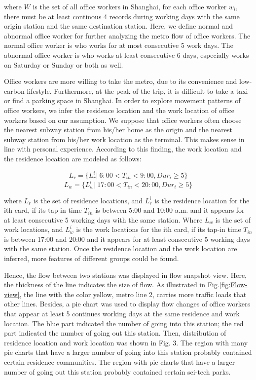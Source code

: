 \documentclass[journal,transmag]{IEEEtran}
\begin{document}
where $W$ is the set of all office workers in Shanghai, for each office worker $w_{i}$, there must be at least continous 4 records during working days with the same origin station and the same destination station.
Here, we define normal and abnormal office worker for further analyzing the metro flow of office workers. The normal office worker is who works for at most consecutive 5 work days. The abnormal office worker is who works at least consecutive 6 days, especially works on Saturday or Sunday or both as well. 

Office workers are more willing to take the metro, due to its convenience and low-carbon lifestyle. Furthermore, at the peak of the trip, it is difficult to take a taxi or find a parking space in Shanghai. In order to explore movement patterns of office workers, we infer the residence location and the work location of office workers based on our assumption. We suppose that office workers often choose the nearest subway station from his/her home as the origin and the nearest subway station from his/her work location as the terminal. This makes sense in line with personal experience. According to this finding, the work location and the residence location are modeled as follows:

\begin{equation}
L_{r}=\{L_{r}^i|\ 6:00< T_{in} < 9:00, Dur_{i}\ge5\}
\end{equation}
\begin{equation}
L_{w}=\{L_{w}^i|\ 17:00< T_{in} < 20:00, Dur_{i}\ge5\}
\end{equation}

where $L_{r}$ is the set of residence locations, and $L_{r}^i$ is the residence location for the ith card, if its tap-in time $T_{in}$ is between 5:00 and 10:00 a.m. and it appears for at least consecutive 5 working days with the same station. Where $L_{w}$ is the set of work locations, and $L_{w}^i$ is the work locations for the ith card, if its tap-in time $T_{in}$ is between 17:00 and 20:00 and it appears for at least consecutive 5 working days with the same station. Once the residence location and the work location are inferred, more features of different groups could be found.

Hence, the flow between two stations was displayed in flow snapshot view.  Here, the thickness of the line indicates the size of flow. As illustrated in Fig.\ref{fig:Flow-view}, the line with the color yellow, metro line 2, carries more traffic loads that other lines. Besides, a pie chart was used to display flow changes of office workers that appear at least 5 continues working days at the same residence and work location. The blue part indicated the number of going into this station; the red part indicated the number of going out this station. Then, distribution of residence location and work location was shown in Fig. 3. The region with many pie charts that have a larger number of going into this station probably contained certain residence communities. The region with pie charts that have a larger number of going out this station probably contained certain sci-tech parks. 
\end{document}
